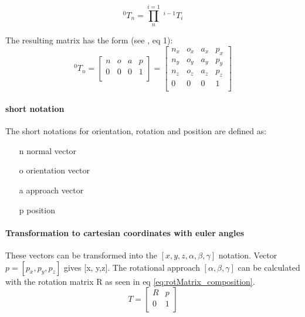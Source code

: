 \begin{equation} \label{eq:SummofTranfMatr}
	^0T_n=\prod_{n}^{i=1} \phantom{.}^{i-1}T_i
\end{equation}


The resulting matrix has the form (see \cite{invKinSolYanWu}, eq 1):
\begin{equation}\label{eq:matrixForm}
	^0T_n=
	\begin{bmatrix}
	n & o & a & p \\
	0 & 0 & 0 & 1 \\
	\end{bmatrix}
	=
	\begin{bmatrix}
	n_x & o_x & a_x & p_x \\
	n_y & o_y & a_y & p_y \\ %
	n_z & o_z & a_z & p_z \\
	0 & 0 & 0 & 1 \\
	\end{bmatrix}
\end{equation}

\paragraph{short notation}
The short notations for orientation, rotation and position are defined as:

\begin{itemize}
	\item[n] normal vector
	\item[o] orientation vector
	\item[a] approach vector
	\item[p] position
\end{itemize}
  

\paragraph{Transformation to cartesian coordinates with euler angles }
These vectors can be transformed into the $[x,y,z,\alpha,\beta,\gamma]$ notation.
Vector $p = [p_x, p_y, p_z] $ gives [x, y,z].
The rotational approach $[\alpha, \beta, \gamma]$ can be calculated with the rotation matrix R as seen in eq \ref{eq:rotMatrix_composition}.
\begin{equation}\label{eq:rotMatrix_composition}
	T = 
	\begin{bmatrix}
	R & p \\
	0 & 1 \\
	\end{bmatrix}
\end{equation}

